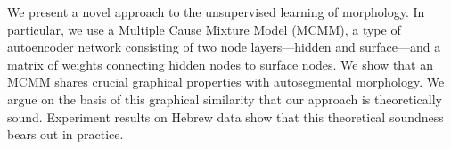 We present a novel approach to the unsupervised learning of morphology.  In particular, we use a Multiple Cause Mixture Model (MCMM), a type of autoencoder network consisting of two node layers---hidden and surface---and a matrix of weights connecting hidden nodes to surface nodes. We show that an MCMM shares crucial graphical properties with autosegmental morphology. We argue on the basis of this graphical similarity that our approach is theoretically sound. Experiment results on Hebrew data show that this theoretical soundness bears out in practice.
